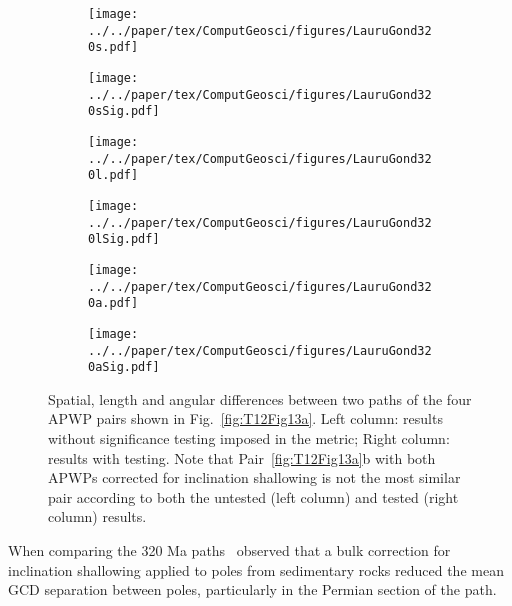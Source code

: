 \begin{figure*}[tbp]
  \captionsetup[subfigure]{singlelinecheck=off,justification=raggedright,aboveskip=-6pt,belowskip=-6pt}
  \centering
  \begin{subfigure}[htbp]{.495\textwidth}
    \centering
	\caption{}\label{fig:LGs}
    \texttt{[image: ../../paper/tex/ComputGeosci/figures/LauruGond320s.pdf]}
  \end{subfigure}
  \vspace{.5em}
  \begin{subfigure}[htbp]{.495\textwidth}
    \centering
    \caption{}\label{fig:LGsS}
    \texttt{[image: ../../paper/tex/ComputGeosci/figures/LauruGond320sSig.pdf]}
  \end{subfigure}
  \begin{subfigure}[htbp]{.495\textwidth}
    \centering
    \caption{}\label{fig:LGl}
    \texttt{[image: ../../paper/tex/ComputGeosci/figures/LauruGond320l.pdf]}
  \end{subfigure}
  \vspace{.5em}
  \begin{subfigure}[htbp]{.495\textwidth}
    \centering
    \caption{}\label{fig:LGlS}
    \texttt{[image: ../../paper/tex/ComputGeosci/figures/LauruGond320lSig.pdf]}
  \end{subfigure}
  \begin{subfigure}[htbp]{.495\textwidth}
    \centering
    \caption{}\label{fig:LGa}
    \texttt{[image: ../../paper/tex/ComputGeosci/figures/LauruGond320a.pdf]}
  \end{subfigure}
  \begin{subfigure}[htbp]{.495\textwidth}
    \centering
    \caption{}\label{fig:LGaS}
    \texttt{[image: ../../paper/tex/ComputGeosci/figures/LauruGond320aSig.pdf]}
  \end{subfigure}
\caption[]{Spatial, length and angular differences between two paths of the four
APWP pairs shown in Fig.~\ref{fig:T12Fig13a}. Left column: results without
significance testing imposed in the metric; Right column: results with testing.
Note that Pair~\ref{fig:T12Fig13a}b with both APWPs corrected for inclination
shallowing is not the most similar pair according to both the untested (left
column) and tested (right column) results.}\label{fig:LauruG}
\end{figure*}

When comparing the 320 Ma paths~\cite[in their Figure 13(a)]{T12}
observed that a bulk correction for inclination shallowing applied to poles from
sedimentary rocks reduced the mean GCD separation between poles, particularly in
the Permian section of the path.

